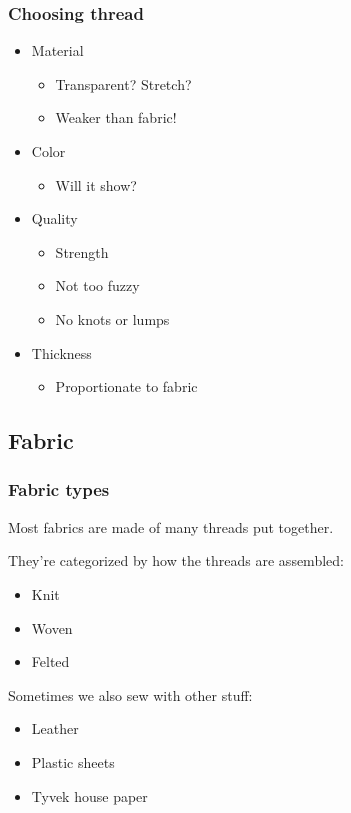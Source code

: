 \documentclass{beamer}
\begin{document}
\begin{frame}[fragile]
\frametitle{Choosing thread}
    \begin{itemize}
    \item Material
        \begin{itemize}
            \item Transparent? Stretch?
            \item Weaker than fabric!
        \end{itemize}
    \item Color
        \begin{itemize}
            \item Will it show?
        \end{itemize}
    \item Quality
        \begin{itemize}
            \item Strength
            \item Not too fuzzy
            \item No knots or lumps
        \end{itemize}
    \item Thickness
        \begin{itemize}
            \item Proportionate to fabric
        \end{itemize}
    \end{itemize}
\end{frame}

\subsection{Fabric}

\begin{frame}[fragile]
\tableofcontents[currentsubsection]
\end{frame}

\begin{frame}[fragile]
\frametitle{Fabric types}
Most fabrics are made of many threads put together.

They're categorized by how the threads are assembled:
\begin{itemize}
\item Knit
\item Woven
\item Felted
\end{itemize}
Sometimes we also sew with other stuff:
\begin{itemize}
\item Leather
\item Plastic sheets
\item Tyvek house paper
\end{itemize}
\end{frame}
\end{document}
